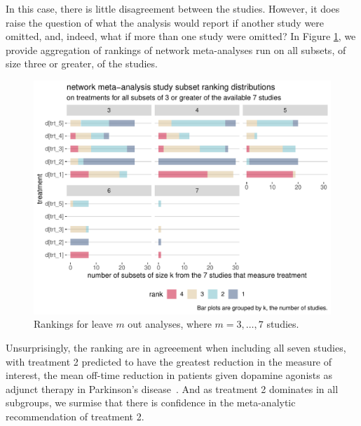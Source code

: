 \documentclass[12pt]{article}\usepackage[]{graphicx}\usepackage[]{color}
\makeatletter
\def\maxwidth{ %
  \ifdim\Gin@nat@width>\linewidth
    \linewidth
  \else
    \Gin@nat@width
  \fi
}
\newenvironment{knitrout}{}{} %
\makeatother
\begin{document}
In this case, there is little disagreement between the studies. However, it does raise the question of what the analysis would report if another study were omitted, and, indeed, what if more than one study were omitted? In Figure \ref{fig:leavem}, we provide aggregation of rankings of network meta-analyses run on all subsets, of size three or greater, of the studies.











\begin{figure}
\centering
\begin{knitrout}
\color{fgcolor}
\includegraphics[width=\maxwidth]{figure/leavem-1} 

\end{knitrout}

\caption{Rankings for leave $m$ out analyses, where $m = 3, \dots, 7$ studies.}
\label{fig:leavem}
\end{figure}

Unsurprisingly, the ranking are in agreeement when including all seven studies, with treatment 2 predicted to have the greatest reduction in the measure of interest, the mean off-time reduction in patients given dopamine agonists as adjunct therapy in Parkinson's disease~\cite{phillippo_multinma_2020}. And as treatment 2 dominates in all subgroups, we surmise that there is confidence in the meta-analytic recommendation of treatment 2.
\end{document}
